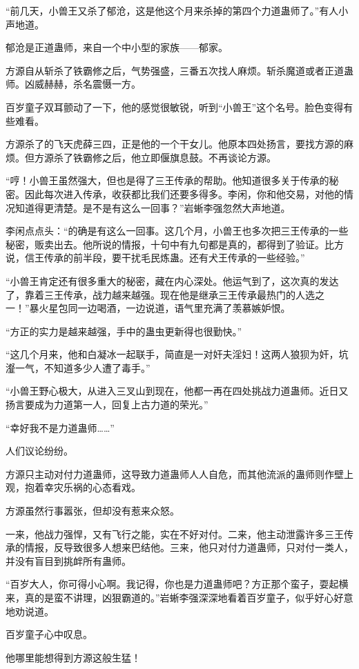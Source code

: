 \begin{this_body}
“前几天，小兽王又杀了郁沧，这是他这个月来杀掉的第四个力道蛊师了。”有人小声地道。

郁沧是正道蛊师，来自一个中小型的家族——郁家。

方源自从斩杀了铁霸修之后，气势强盛，三番五次找人麻烦。斩杀魔道或者正道蛊师。凶威赫赫，杀名震慑一方。

百岁童子双耳颤动了一下，他的感觉很敏锐，听到“小兽王”这个名号。脸色变得有些难看。

方源杀了的飞天虎薛三四，正是他的一个干女儿。他原本四处扬言，要找方源的麻烦。但方源杀了铁霸修之后，他立即偃旗息鼓。不再谈论方源。

“哼！小兽王虽然强大，但也是得了三王传承的帮助。他知道很多关于传承的秘密。因此每次进入传承，收获都比我们还要多得多。李闲，你和他交易，对他的情况知道得更清楚。是不是有这么一回事？”岩蜥李强忽然大声地道。

李闲点点头：“的确是有这么一回事。这几个月，小兽王也多次把三王传承的一些秘密，贩卖出去。他所说的情报，十句中有九句都是真的，都得到了验证。比方说，信王传承的前半段，要干扰毛民炼蛊。还有犬王传承的一些经验。”

“小兽王肯定还有很多重大的秘密，藏在内心深处。他运气到了，这次真的发达了，靠着三王传承，战力越来越强。现在他是继承三王传承最热门的人选之一！”暴火星包同一边喝酒，一边说道，语气里充满了羡慕嫉妒恨。

“方正的实力是越来越强，手中的蛊虫更新得也很勤快。”

“这几个月来，他和白凝冰一起联手，简直是一对奸夫淫妇！这两人狼狈为奸，坑瀣一气，不知道多少人遭了毒手。”

“小兽王野心极大，从进入三叉山到现在，他都一再在四处挑战力道蛊师。近日又扬言要成为力道第一人，回复上古力道的荣光。”

“幸好我不是力道蛊师……”

人们议论纷纷。

方源只主动对付力道蛊师，这导致力道蛊师人人自危，而其他流派的蛊师则作壁上观，抱着幸灾乐祸的心态看戏。

方源虽然行事嚣张，但却没有惹来众怒。

一来，他战力强悍，又有飞行之能，实在不好对付。二来，他主动泄露许多三王传承的情报，反导致很多人想来巴结他。三来，他只对付力道蛊师，只对付一类人，并没有盲目到挑衅所有蛊师。

“百岁大人，你可得小心啊。我记得，你也是力道蛊师吧？方正那个蛮子，耍起横来，真的是蛮不讲理，凶狠霸道的。”岩蜥李强深深地看着百岁童子，似乎好心好意地劝说道。

百岁童子心中叹息。

他哪里能想得到方源这般生猛！


\end{this_body}
